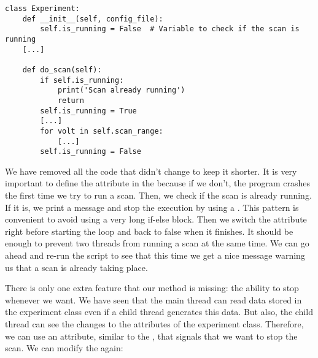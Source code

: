 \begin{verbatim}
class Experiment:
    def __init__(self, config_file):
        self.is_running = False  # Variable to check if the scan is running
    [...]

    def do_scan(self):
        if self.is_running:
            print('Scan already running')
            return
        self.is_running = True
        [...]
        for volt in self.scan_range:
            [...]
        self.is_running = False
\end{verbatim}

We have removed all the code that didn't change to keep it shorter. It is very important to define the  attribute in the  because if we don't, the program crashes the first time we try to run a scan. Then, we check if the scan is already running. If it is, we print a message and stop the execution by using a . This pattern is convenient to avoid using a very long if-else block. Then we switch the attribute right before starting the loop and back to false when it finishes. It should be enough to prevent two threads from running a scan at the same time. We can go ahead and re-run the script to see that this time we get a nice message warning us that a scan is already taking place.


There is only one extra feature that our  method is missing: the ability to stop whenever we want. We have seen that the main thread can read data stored in the experiment class even if a child thread generates this data. But also, the child thread can see the changes to the attributes of the experiment class. Therefore, we can use an attribute, similar to the , that signals that we want to stop the scan. We can modify the  again:

